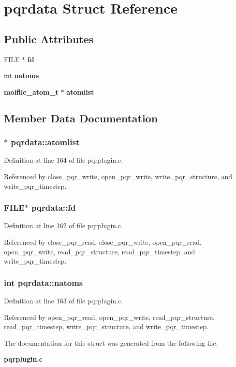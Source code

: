 \section{pqrdata  Struct Reference}
\label{structpqrdata}
\subsection*{Public Attributes}
\begin{CompactItemize}
\item 
FILE $\ast$ {\bf fd}
\item 
int {\bf natoms}
\item 
{\bf molfile\_\-atom\_\-t} $\ast$ {\bf atomlist}
\end{CompactItemize}


\subsection{Member Data Documentation}
\subsubsection{$\ast$ pqrdata::atomlist}\label{structpqrdata_m2}




Definition at line 164 of file pqrplugin.c.

Referenced by close\_\-pqr\_\-write, open\_\-pqr\_\-write, write\_\-pqr\_\-structure, and write\_\-pqr\_\-timestep.
\subsubsection{\setlength{\rightskip}{0pt plus 5cm}FILE$\ast$ pqrdata::fd}\label{structpqrdata_m0}




Definition at line 162 of file pqrplugin.c.

Referenced by close\_\-pqr\_\-read, close\_\-pqr\_\-write, open\_\-pqr\_\-read, open\_\-pqr\_\-write, read\_\-pqr\_\-structure, read\_\-pqr\_\-timestep, and write\_\-pqr\_\-timestep.
\subsubsection{\setlength{\rightskip}{0pt plus 5cm}int pqrdata::natoms}\label{structpqrdata_m1}




Definition at line 163 of file pqrplugin.c.

Referenced by open\_\-pqr\_\-read, open\_\-pqr\_\-write, read\_\-pqr\_\-structure, read\_\-pqr\_\-timestep, write\_\-pqr\_\-structure, and write\_\-pqr\_\-timestep.

The documentation for this struct was generated from the following file:\begin{CompactItemize}
\item 
{\bf pqrplugin.c}\end{CompactItemize}
